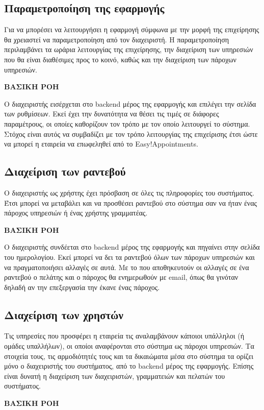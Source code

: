\subsection{Παραμετροποίηση της εφαρμογής}
Για να μπορέσει να λειτουργήσει η εφαρμογή σύμφωνα με την μορφή της επιχείρησης θα χρειαστεί να παραμετροποίηση από τον διαχειριστή. Η παραμετροποίηση περιλαμβάνει τα ωράρια λειτουργίας της επιχείρησης, την διαχείριση των υπηρεσιών που θα είναι διαθέσιμες προς το κοινό, καθώς και την διαχείριση των πάροχων υπηρεσιών.

\textbf{ΒΑΣΙΚΗ ΡΟΗ}

Ο διαχειριστής εισέρχεται στο backend μέρος της εφαρμογής και επιλέγει την σελίδα των ρυθμίσεων. Εκεί έχει την δυνατότητα να θέσει τις τιμές σε διάφορες παραμέτρους, οι οποίες καθορίζουν τον τρόπο με τον οποίο λειτουργεί το σύστημα. Στόχος είναι αυτός να συμβαδίζει με τον τρόπο λειτουργίας της επιχείρισης έτσι ώστε να μπορεί η εταιρεία να επωφεληθεί από το Easy!Appointments.

\subsection{Διαχείριση των ραντεβού}
Ο διαχειριστής ως χρήστης έχει πρόσβαση σε όλες τις πληροφορίες του συστήματος. Έτσι μπορεί να μεταβάλει και να προσθέσει ραντεβού στο σύστημα σαν να ήταν ένας πάροχος υπηρεσιών ή ένας χρήστης γραμματέας.

\textbf {ΒΑΣΙΚΗ ΡΟΗ}

Ο διαχειριστής συνδέεται στο backend μέρος της εφαρμογής και πηγαίνει στην σελίδα του ημερολογίου. Εκεί μπορεί να δει τα ραντεβού όλων των πάροχων υπηρεσιών και να πραγματοποιήσει αλλαγές σε αυτά. Με το που αποθηκευτούν οι αλλαγές σε ένα ραντεβού ο πελάτης και ο πάροχος θα ενημερωθούν με email, όπως θα γινόταν δηλαδή αν την επεξεργασία την έκανε ένας πάροχος.

\subsection {Διαχείριση των χρηστών}
Τις υπηρεσίες που προσφέρει η εταιρεία τις αναλαμβάνουν κάποιοι υπάλληλοι (ή ομάδες υπαλλήλων), οι οποίοι αναφέρονται στο σύστημα ως πάροχοι υπηρεσιών. Τα στοιχεία τους, τις αρμοδιότητές τους και τα δικαιώματα μέσα στο σύστημα τα ορίζει μόνο ο διαχειριστής του συστήματος, από το backend μέρος της εφαρμογής. Επίσης είναι δυνατή η διαχείριση των διαχειριστών, γραμματειών και πελατών του συστήματος.

\textbf{ΒΑΣΙΚΗ ΡΟΗ}

